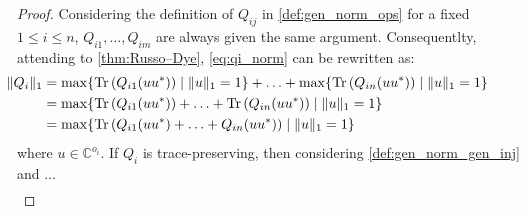 \begin{proof}
Considering the definition of $Q_{ij}$ in \autoref{def:gen_norm_ops} for a fixed $1 \leq i \leq n$, $Q_{i1}, \ldots, Q_{im}$ are always given the same argument.
Consequentlty, attending to \autoref{thm:Russo–Dye}, \autoref{eq:qi_norm} can be rewritten as:
\begin{align} 
  \hspace{-30pt} \lVert Q_i \rVert_{1} & = \max \{\text{Tr}\left(Q_{i1}(uu^{*}) \right) \mid \lVert u \rVert_{1}=1 \} + \ldots +  \max \{\text{Tr}\left(Q_{in}(u u^{*}) \right) \mid  \lVert u \rVert_{1}=1 \}\\ \label{eq:qi_ptp_norm_1}
  \hspace{-30pt} & =  \max \{ \text{Tr}\left(Q_{i1}(uu^{*}) \right) + \ldots + \text{Tr}\left(Q_{in}(u u^{*}) \right) \mid   \lVert u \rVert_{1}=1 \} \\
  \hspace{-30pt} & =  \max \{ \text{Tr}\left(Q_{i1}(uu^{*}) + \ldots + Q_{in}(u u^{*}) \right) \mid   \lVert u \rVert_{1}=1 \}  \label{eq:qi_ptp_norm_3}
\end{align}
where $u \in \mathbb{C}^{o_i}$.
If $Q_i$ is trace-preserving, then considering \autoref{def:gen_norm_gen_inj} and ...
\begin{equation}
  \begin{split}

\end{split}
\end{equation}
\end{proof}
